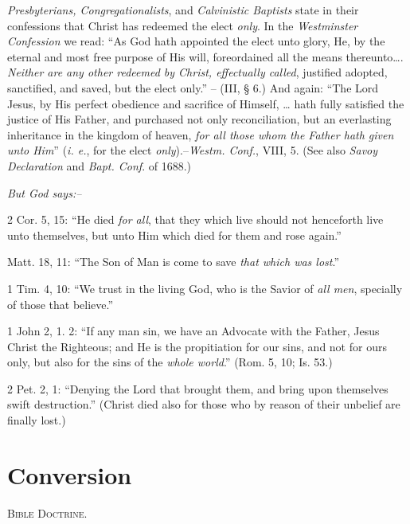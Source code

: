 \documentclass[
]{book}
\begin{document}
\emph{Presbyterians, Congregationalists}, and \emph{Calvinistic Baptists} state in their confessions that Christ has redeemed the elect \emph{only}. In the \emph{Westminster Confession} we read: ``As God hath appointed the elect unto glory, He, by the eternal and most free purpose of His will, foreordained all the means thereunto\ldots. \emph{Neither are any other redeemed by Christ, effectually called}, justified adopted, sanctified, and saved, but the elect only.'' -- (III, § 6.) And again: ``The Lord Jesus, by His perfect obedience and sacrifice of Himself, \ldots{} hath fully satisfied the justice of His Father, and purchased not only reconciliation, but an everlasting inheritance in the kingdom of heaven, \emph{for all those whom the Father hath given unto Him}'' (\emph{i. e.}, for the elect \emph{only}).--\emph{Westm. Conf.}, VIII, 5. (See also \emph{Savoy Declaration} and \emph{Bapt. Conf}. of 1688.)

\begin{center}
\textsl{But God says:--}
\end{center}

2 Cor. 5, 15: ``He died \emph{for all}, that they which live should not henceforth live unto themselves, but unto Him which died for them and rose again.''

Matt. 18, 11: ``The Son of Man is come to save \emph{that which was lost}.''

1 Tim. 4, 10: ``We trust in the living God, who is the Savior of \emph{all men}, specially of those that believe.''

1 John 2, 1. 2: ``If any man sin, we have an Advocate with the Father, Jesus Christ the Righteous; and He is the propitiation for our sins, and not for ours only, but also for the sins of the \emph{whole world}.'' (Rom. 5, 10; Is. 53.)

2 Pet. 2, 1: ``Denying the Lord that brought them, and bring upon themselves swift destruction.'' (Christ died also for those who by reason of their unbelief are finally lost.)

\section*{\texorpdfstring{Conversion}{Conversion}}\label{conversion}

\begin{center}
\textsc{Bible Doctrine.}
\end{center}
\end{document}
